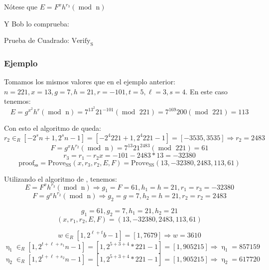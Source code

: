 Nótese que $E = F^{x}h^{r_{3}} (\operatorname{mod} \text{ n})$

Y Bob lo comprueba: \\
\begin{minipage}{0.9\textwidth}
    \begin{algorithm}[H] \label{alg:verify s}
        \caption{Prueba de Cuadrado: $\operatorname{Verify_{S}}$}
    \end{algorithm}
\end{minipage}

\subsubsection{Ejemplo}

Tomamos los mismos valores que en el ejemplo anterior: $n = 221, x = 13, g = 7, h = 21, r = -101, t = 5, \ell = 3, s = 4$. En este caso tenemos:
$$E = g^{x^{2}}h^{r} (\operatorname{mod} \text{ n}) = 7^{13^{2}}21^{-101} (\operatorname{mod} \text{ 221}) = 7^{169}200 (\operatorname{mod} \text{ 221}) = 113$$

Con esto el algoritmo de  queda:
$$r_{2} \in_{R} [-2^{s}n+1, 2^{s}n-1] = [-2^{4}221+1, 2^{4}221-1] = [-3535, 3535] \Rightarrow r_{2} = 2483$$
$$F = g^{x}h^{r_{2}} (\operatorname{mod} \text{ n}) = 7^{13}21^{2483} (\operatorname{mod} \text{ 221}) = 61$$
$$r_{3} = r_{1} - r_{2}x = -101 - 2483*13 = -32380$$
$$\operatorname{proof_{ss}} = \operatorname{Prove_{SS}}(x, r_{3}, r_{2}, E, F) = \operatorname{Prove_{SS}}(13, -32380, 2483, 113, 61)$$

Utilizando el algoritmo de , tenemos:
$$E = F^{x}h^{r_{3}} (\operatorname{mod} \text{ n}) \Rightarrow g_{1} = F = 61, h_{1} = h = 21, r_{1} = r_{3} = -32380$$
$$F = g^{x}h^{r_{2}} (\operatorname{mod} \text{ n}) \Rightarrow g_{2} = g = 7, h_{2} = h = 21, r_{2} = r_{2} = 2483$$

$$g_{1} = 61, g_{2} = 7, h_{1} = 21, h_{2} = 21$$
$$(x, r_{1}, r_{2}, E, F) = (13, -32380, 2483, 113, 61)$$

$$w \in_{R} [1, 2^{\ell+t}b-1] = [1, 7679] \Rightarrow w = 3610$$
$$\upeta_{1} \in_{R} [1, 2^{t + \ell + s_{1}}n-1] = [1, 2^{5 + 3 + 4}*221-1] = [1, 905215] \Rightarrow \upeta_{1} = 857159$$
$$\upeta_{2} \in_{R} [1, 2^{t + \ell + s_{2}}n-1] = [1, 2^{5 + 3 + 4}*221-1] = [1, 905215] \Rightarrow \upeta_{2} = 617720$$

